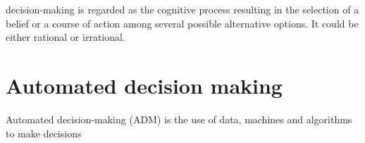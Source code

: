\documentclass[a4paper]{article}
\title{}
\date{}
\begin{document}
    \maketitle
    decision-making is regarded as the cognitive process resulting in the selection of a belief or a course of action among several possible alternative options. It could be either rational or irrational.
    
    \section{Automated decision making}
        Automated decision-making (ADM) is the use of data, machines and algorithms to make decisions
\end{document}
